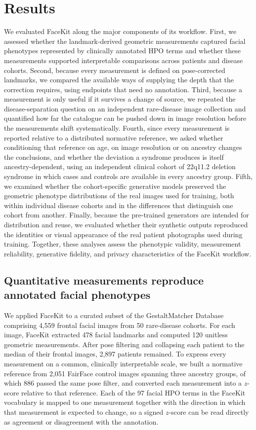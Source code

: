 \documentclass[11pt]{article}
\begin{document}
\section{Results}

We evaluated FaceKit along the major components of its workflow. First, we assessed whether the landmark-derived geometric measurements captured facial phenotypes represented by clinically annotated HPO terms and whether these measurements supported interpretable comparisons across patients and disease cohorts. Second, because every measurement is defined on pose-corrected landmarks, we compared the available ways of supplying the depth that the correction requires, using endpoints that need no annotation. Third, because a measurement is only useful if it survives a change of source, we repeated the disease-separation question on an independent rare-disease image collection and quantified how far the catalogue can be pushed down in image resolution before the measurements shift systematically. Fourth, since every measurement is reported relative to a distributed normative reference, we asked whether conditioning that reference on age, on image resolution or on ancestry changes the conclusions, and whether the deviation a syndrome produces is itself ancestry-dependent, using an independent clinical cohort of 22q11.2 deletion syndrome in which cases and controls are available in every ancestry group. Fifth, we examined whether the cohort-specific generative models preserved the geometric phenotype distributions of the real images used for training, both within individual disease cohorts and in the differences that distinguish one cohort from another. Finally, because the pre-trained generators are intended for distribution and reuse, we evaluated whether their synthetic outputs reproduced the identities or visual appearance of the real patient photographs used during training. Together, these analyses assess the phenotypic validity, measurement reliability, generative fidelity, and privacy characteristics of the FaceKit workflow.

\subsection{Quantitative measurements reproduce annotated facial phenotypes}
\label{sec:validity}

We applied FaceKit to a curated subset of the GestaltMatcher Database comprising
4,559 frontal facial images from 50 rare-disease cohorts. For each image, FaceKit
extracted 478 facial landmarks and computed 120 unitless geometric measurements.
After pose filtering and collapsing each patient to the median of their frontal
images, 2,897 patients remained. To express every measurement on a common,
clinically interpretable scale, we built a normative reference from 2,051 FairFace
control images spanning three ancestry groups, of which 886 passed the same pose
filter, and converted each measurement into a $z$-score relative to that reference.
Each of the 97 facial HPO terms in the FaceKit vocabulary is mapped to one
measurement together with the direction in which that measurement is expected to
change, so a signed $z$-score can be read directly as agreement or disagreement
with the annotation.
\end{document}
